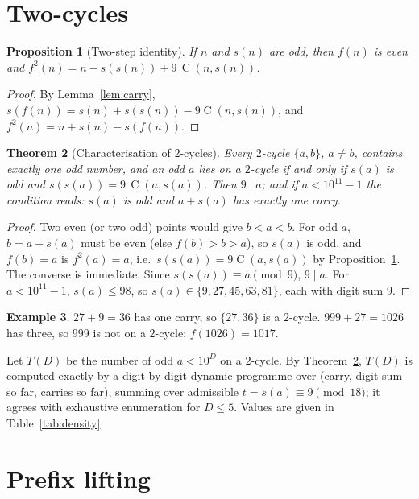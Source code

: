 \documentclass[11pt]{article}
\newtheorem{theorem}{Theorem}[section]
\newtheorem{proposition}[theorem]{Proposition}
\theoremstyle{definition}
\newtheorem{example}[theorem]{Example}
\theoremstyle{remark}
\newcommand{\C}{\operatorname{C}}
\begin{document}
\section{Two-cycles}

\begin{proposition}[Two-step identity]\label{prop:twostep}
If $n$ and $s(n)$ are odd, then $f(n)$ is even and
$f^2(n)=n-s(s(n))+9\,\C(n,s(n))$.
\end{proposition}

\begin{proof}
By Lemma~\ref{lem:carry}, $s(f(n))=s(n)+s(s(n))-9\C(n,s(n))$, and
$f^2(n)=n+s(n)-s(f(n))$.
\end{proof}

\begin{theorem}[Characterisation of $2$-cycles]\label{thm:2cycle}
Every $2$-cycle $\{a,b\}$, $a\ne b$, contains exactly one odd number, and an
odd $a$ lies on a $2$-cycle if and only if $s(a)$ is odd and
$s(s(a))=9\,\C(a,s(a))$. Then $9\mid a$; and if $a<10^{11}-1$ the condition
reads: $s(a)$ is odd and $a+s(a)$ has exactly one carry.
\end{theorem}

\begin{proof}
Two even (or two odd) points would give $b<a<b$. For odd $a$, $b=a+s(a)$
must be even (else $f(b)>b>a$), so $s(a)$ is odd, and $f(b)=a$ is
$f^2(a)=a$, i.e.\ $s(s(a))=9\C(a,s(a))$ by Proposition~\ref{prop:twostep}. The
converse is immediate. Since $s(s(a))\equiv a\pmod 9$, $9\mid a$. For
$a<10^{11}-1$, $s(a)\le98$, so $s(a)\in\{9,27,45,63,81\}$, each with digit
sum $9$.
\end{proof}

\begin{example}
$27+9=36$ has one carry, so $\{27,36\}$ is a $2$-cycle. $999+27=1026$ has three,
so $999$ is not on a $2$-cycle: $f(1026)=1017$.
\end{example}

Let $T(D)$ be the number of odd $a<10^D$ on a $2$-cycle. By
Theorem~\ref{thm:2cycle}, $T(D)$ is computed exactly by a digit-by-digit
dynamic programme over (carry, digit sum so far, carries so far), summing over
admissible $t=s(a)\equiv9\pmod{18}$; it agrees with exhaustive enumeration for
$D\le5$. Values are given in Table~\ref{tab:density}.

\section{Prefix lifting}\label{sec:lift}
\end{document}
